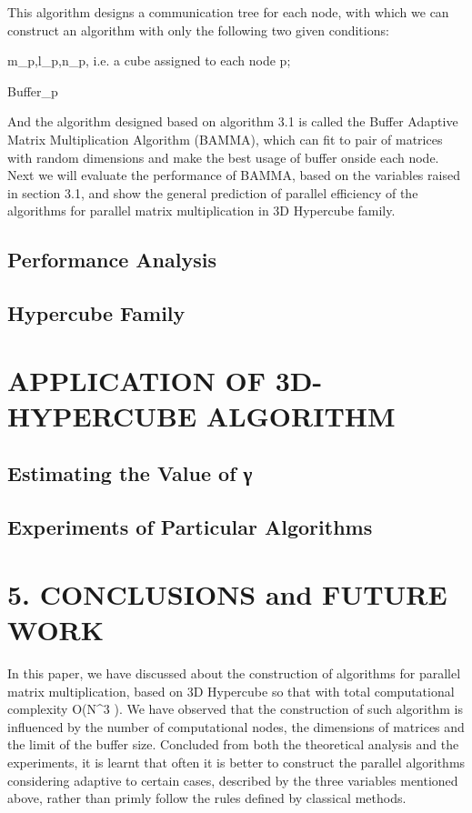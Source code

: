 \documentclass{amsart}
\theoremstyle{definition}
\theoremstyle{remark}
\numberwithin{equation}{section}
\begin{document}
\begin{Theorem 3.1}
\[			\]
			
			This algorithm designs a communication tree for each node, with which we can construct an algorithm with only the following two given conditions:
			
			m_p,l_p,n_p, i.e. a cube assigned to each node p;
			
			Buffer_p
			
			And the algorithm designed based on algorithm 3.1 is called the Buffer Adaptive Matrix Multiplication Algorithm (BAMMA), which can fit to pair of matrices with random dimensions and make the best usage of buffer onside each node.
			Next we will evaluate the performance of BAMMA, based on the variables raised in section 3.1, and show the general prediction of parallel efficiency of the algorithms for parallel matrix multiplication in 3D Hypercube family.
			
			\subsection{Performance Analysis}
			
			\subsection{Hypercube Family}
			
	\section{APPLICATION OF 3D-HYPERCUBE ALGORITHM}
	
		\subsection{Estimating the Value of γ }
		
		\subsection{Experiments of Particular Algorithms}
		
	\section{5.	CONCLUSIONS and FUTURE WORK}
	In this paper, we have discussed about the construction of algorithms for parallel matrix multiplication, based on 3D Hypercube so that with total computational complexity O(N^3 ). We have observed that the construction of such algorithm is influenced by the number of computational nodes, the dimensions of matrices and the limit of the buffer size. Concluded from both the theoretical analysis and the experiments, it is learnt that often it is better to construct the parallel algorithms considering adaptive to certain cases, described by the three variables mentioned above, rather than primly follow the rules defined by classical methods.
	

\end{Theorem 3.1}
\end{document}
